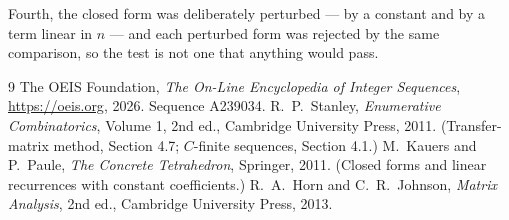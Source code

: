 \documentclass[11pt,a4paper]{article}
\theoremstyle{plain}
\theoremstyle{definition}
\begin{document}
Fourth, the closed form was deliberately perturbed --- by a constant and by a term linear in
$n$ --- and each perturbed form was rejected by the same comparison, so the test is not one
that anything would pass.

\begin{thebibliography}{9}
 The OEIS Foundation, \emph{The On-Line Encyclopedia of Integer
Sequences}, \url{https://oeis.org}, 2026. Sequence A239034.
 R.~P.~Stanley, \emph{Enumerative Combinatorics}, Volume 1, 2nd ed.,
Cambridge University Press, 2011. (Transfer-matrix method, Section 4.7; $C$-finite sequences,
Section 4.1.)
 M.~Kauers and P.~Paule, \emph{The Concrete Tetrahedron}, Springer, 2011.
(Closed forms and linear recurrences with constant coefficients.)
 R.~A.~Horn and C.~R.~Johnson, \emph{Matrix Analysis}, 2nd ed., Cambridge
University Press, 2013.
\end{thebibliography}
\end{document}
